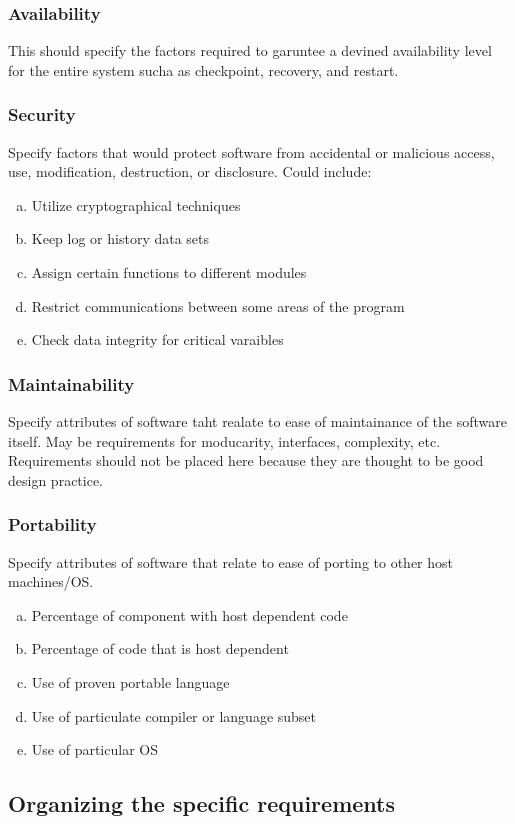 \documentclass[10pt]{article}
\begin{document}
          \subsubsection{Availability}
          This should specify the factors required to garuntee a devined availability level for the entire system sucha as checkpoint, recovery, and restart.
          
          \subsubsection{Security}
          Specify factors that would protect software from accidental or malicious access, use, modification, destruction, or disclosure. Could include:

          \begin{enumerate}[(a)]
          \item{Utilize cryptographical techniques}
          \item{Keep log or history data sets}
          \item{Assign certain functions to different modules}
          \item{Restrict communications between some areas of the program}
          \item{Check data integrity for critical varaibles}
          \end{enumerate}
          
          \subsubsection{Maintainability}
          Specify attributes of software taht realate to ease of maintainance of the software itself. May be requirements for moducarity, interfaces, complexity, etc. Requirements should not be placed here because they are thought to be good design practice.

          \subsubsection{Portability}
          Specify attributes of software that relate to ease of porting to other host machines/OS. 

          \begin{enumerate}[(a)]
          \item{Percentage of component with host dependent code}
          \item{Percentage of code that is host dependent}
          \item{Use of proven portable language}
          \item{Use of particulate compiler or language subset}
          \item{Use of particular OS}
          \end{enumerate}

          
     \subsection{Organizing the specific requirements}
     
     
     
\end{document}
